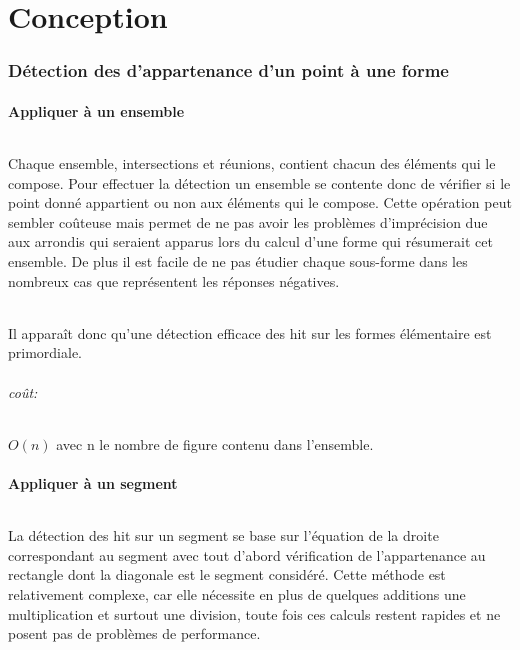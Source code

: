 \part{Conception}

\section{Détection des d’appartenance d'un point à une forme}

\subsection{Appliquer à un ensemble}
\paragraph{}
Chaque ensemble, intersections et réunions, contient chacun des éléments qui le compose. Pour effectuer la détection un ensemble se contente donc de vérifier si le point donné appartient ou non aux éléments qui le compose. Cette opération peut sembler coûteuse mais permet de ne pas avoir les problèmes d’imprécision due aux arrondis qui seraient apparus lors du calcul d'une forme qui résumerait cet ensemble. De plus il est facile de ne pas étudier chaque sous-forme dans les nombreux cas que représentent les réponses négatives.
\paragraph{}
Il apparaît donc qu'une détection efficace des hit sur les formes élémentaire est primordiale.
\paragraph{coût: }
\(O(n)\) avec n le nombre de figure contenu dans l'ensemble.

\subsection{Appliquer à un segment}
\paragraph{}
La détection des hit sur un segment se base sur l’équation de la droite correspondant au segment avec tout d'abord vérification de l’appartenance au rectangle dont la diagonale est le segment considéré. Cette méthode est relativement complexe, car elle nécessite en plus de quelques additions une multiplication et surtout une division, toute fois ces calculs restent rapides et ne posent pas de problèmes de performance.
